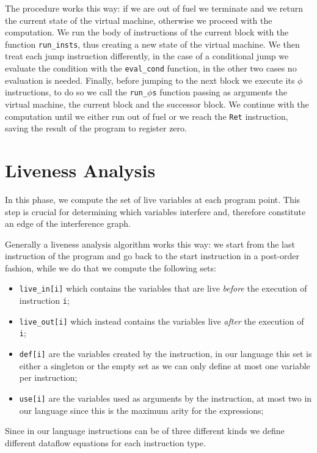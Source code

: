 The procedure works this way: if we are out of fuel we terminate and we return the current state of the virtual machine, otherwise we proceed with the computation.
We run the body of instructions of the current block with the function \texttt{run\_insts}, thus creating a new state of the virtual machine. We then treat each jump instruction differently, in the case of a conditional jump we evaluate the condition with the \texttt{eval\_cond} function, in the other two cases no evaluation is needed. Finally, before jumping to the next block we execute its $\phi$ instructions, to do so we call the \texttt{run\_$\phi$s} function  passing as arguments the virtual machine, the current block and the successor block.
We continue with the computation until we either run out of fuel or we reach the \texttt{Ret} instruction, saving the result of the program to register zero.

\section{Liveness Analysis}
\label{sec:liveness}

In this phase, we compute the set of live variables at each program point. This step is crucial for determining which variables interfere and, therefore constitute an edge of the interference graph.

Generally a liveness analysis algorithm works this way:
we start from the last instruction of the program and go back to the start instruction in a post-order fashion, while we do that we compute the following sets:
\begin{itemize}
  \item \texttt{live\_in[i]} which contains the variables that are live \textit{before} the execution of instruction \texttt i;
  \item \texttt{live\_out[i]} which instead contains the variables live \textit{after} the execution of \texttt i;
  \item \texttt{def[i]} are the variables created by the instruction, in our language this set is either a singleton or the empty set as we can only define at most one variable per instruction;
  \item \texttt{use[i]} are the variables used as arguments by the instruction, at most two in our language since this is the maximum arity for the expressions;
\end{itemize}

Since in our language instructions can be of three different kinds we define different dataflow equations for each instruction type.

